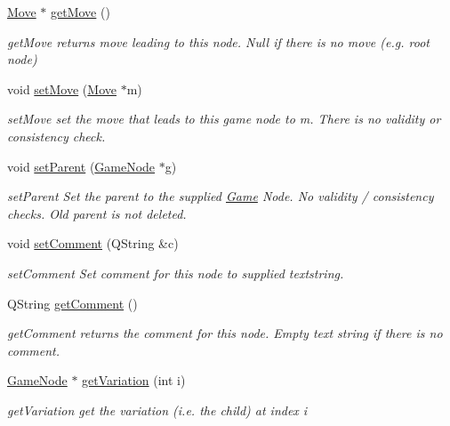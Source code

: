 \begin{DoxyCompactItemize}
\hyperlink{classchess_1_1Move}{Move} $\ast$ \hyperlink{classchess_1_1GameNode_a7ca0e6953eef522ac8dbfd5869ed99a8}{get\-Move} ()
\begin{DoxyCompactList}\small\item\em get\-Move returns move leading to this node. Null if there is no move (e.\-g. root node) \end{DoxyCompactList}\item 
void \hyperlink{classchess_1_1GameNode_a7c501e59559bf59aac7cb5337151e6c5}{set\-Move} (\hyperlink{classchess_1_1Move}{Move} $\ast$m)
\begin{DoxyCompactList}\small\item\em set\-Move set the move that leads to this game node to m. There is no validity or consistency check. \end{DoxyCompactList}\item 
void \hyperlink{classchess_1_1GameNode_a8a3dcdb5d5dedc45e1cbf78405f137e7}{set\-Parent} (\hyperlink{classchess_1_1GameNode}{Game\-Node} $\ast$g)
\begin{DoxyCompactList}\small\item\em set\-Parent Set the parent to the supplied \hyperlink{classchess_1_1Game}{Game} Node. No validity / consistency checks. Old parent is not deleted. \end{DoxyCompactList}\item 
void \hyperlink{classchess_1_1GameNode_a706311ef7dfc985b5bb9afc1802371e2}{set\-Comment} (Q\-String \&c)
\begin{DoxyCompactList}\small\item\em set\-Comment Set comment for this node to supplied textstring. \end{DoxyCompactList}\item 
Q\-String \hyperlink{classchess_1_1GameNode_af9256a164fa665dda2b6310af1d3a7d3}{get\-Comment} ()
\begin{DoxyCompactList}\small\item\em get\-Comment returns the comment for this node. Empty text string if there is no comment. \end{DoxyCompactList}\item 
\hyperlink{classchess_1_1GameNode}{Game\-Node} $\ast$ \hyperlink{classchess_1_1GameNode_a181e93f7fdb90e82f259f4add006f389}{get\-Variation} (int i)
\begin{DoxyCompactList}\small\item\em get\-Variation get the variation (i.\-e. the child) at index i \end{DoxyCompactList}\item 

\end{DoxyCompactItemize}
